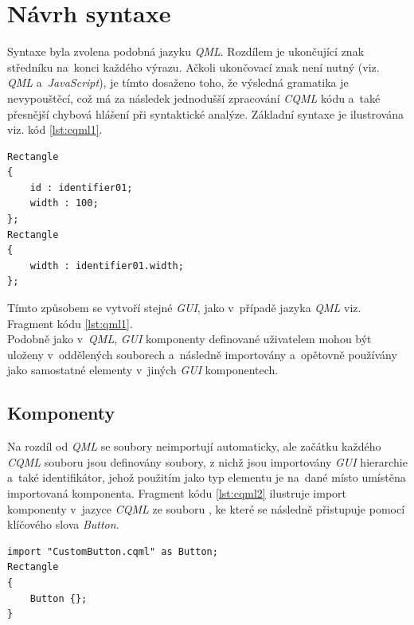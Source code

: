 \documentclass[11pt,twoside,a4paper]{book}
\begin{document}
\section{Návrh syntaxe}
Syntaxe byla zvolena podobná jazyku \textit{QML}. Rozdílem je ukončující znak středníku na~konci každého výrazu. Ačkoli ukončovací znak není nutný (viz. \textit{QML} a~\textit{JavaScript}), je tímto dosaženo toho, že výsledná gramatika je nevypouštěcí, což má za následek jednodušší zpracování \textit{CQML} kódu a~také přesnější chybová hlášení při syntaktické analýze. Základní syntaxe je ilustrována viz. kód \ref{lst:cqml1}.
\begin{lstlisting}[frame=single,caption=Tvorba dvou jednoduchých elementů pomocí jazyka \textit{CQML}.,label=lst:cqml1]
Rectangle
{
	id : identifier01;
	width : 100;
};
Rectangle
{
	width : identifier01.width;
};
\end{lstlisting}
Tímto způsobem se vytvoří stejné \textit{GUI}, jako v~případě jazyka \textit{QML} viz. Fragment kódu \ref{lst:qml1}.\\
Podobně jako v~\textit{QML}, \textit{GUI} komponenty definované uživatelem mohou být uloženy v~oddělených souborech a~následně importovány a~opětovně používány jako samostatné elementy v~jiných \textit{GUI} komponentech. 
\subsection{Komponenty}
Na rozdíl od \textit{QML} se soubory neimportují automaticky, ale začátku každého \textit{CQML} souboru jsou definovány soubory, z nichž jsou importovány \textit{GUI} hierarchie a~také identifikátor, jehož použitím jako typ elementu je na~dané místo umístěna importovaná komponenta. Fragment kódu \ref{lst:cqml2} ilustruje import komponenty v~jazyce \textit{CQML} ze souboru , ke které se následně přistupuje pomocí klíčového slova \textit{Button}.
\begin{lstlisting}[frame=single,caption=Ukázka importu komponenty v~jazyce \textit{CQML}.,label=lst:cqml2]
import "CustomButton.cqml" as Button;
Rectangle
{
	Button {};
}
\end{lstlisting}
\end{document}
